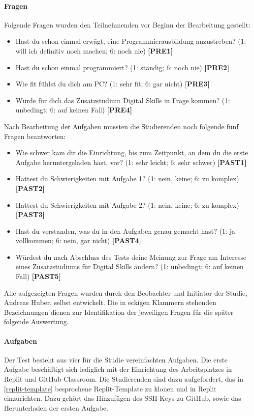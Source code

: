 \paragraph{Fragen}
Folgende Fragen wurden den Teilnehmenden vor Beginn der Bearbeitung gestellt:

\begin{itemize}
    \item Hast du schon einmal erwägt, eine Programmierausbildung anzustreben?
    (1: will ich definitiv noch machen; 6: noch nie) \textbf{[PRE1]}
    \item Hast du schon einmal programmiert? (1: ständig; 6: noch nie)
    \textbf{[PRE2]}
    \item Wie fit fühlst du dich am PC? (1: sehr fit; 6: gar nicht)
    \textbf{[PRE3]}
    \item Würde für dich das Zusatzstudium Digital Skills in Frage kommen?
    (1: unbedingt; 6: auf keinen Fall) \textbf{[PRE4]}
\end{itemize}

Nach Bearbeitung der Aufgaben mussten die Studierenden noch folgende fünf
Fragen beantworten:

\begin{itemize}
    \item Wie schwer kam dir die Einrichtung, bis zum Zeitpunkt, an dem du die
    erste Aufgabe heruntergeladen hast, vor? (1: sehr leicht; 6: sehr schwer)
    \textbf{[PAST1]}
    \item Hattest du Schwierigkeiten mit Aufgabe 1? (1: nein, keine; 6: zu
    komplex) \textbf{[PAST2]}
    \item Hattest du Schwierigkeiten mit Aufgabe 2? (1: nein, keine; 6: zu
    komplex) \textbf{[PAST3]}
    \item Hast du verstanden, was du in den Aufgaben genau gemacht hast? (1: ja
    vollkommen; 6: nein, gar nicht) \textbf{[PAST4]}
    \item Würdest du nach Abschluss des Tests deine Meinung zur Frage am
    Interesse eines Zusatzstudiums für Digital Skills ändern? (1: unbedingt;
    6: auf keinen Fall) \textbf{[PAST5]}
\end{itemize}

Alle aufgezeigten Fragen wurden durch den Beobachter und Initiator der Studie,
Andreas Huber, selbst entwickelt. Die in eckigen Klammern stehenden
Bezeichnungen dienen zur Identifikation der jeweiligen Fragen für die später
folgende Auswertung.

\paragraph{Aufgaben}
Der Test besteht aus vier für die Studie vereinfachten Aufgaben. Die erste
Aufgabe beschäftigt sich lediglich mit der Einrichtung des Arbeitsplatzes in
Replit und GitHub-Classroom. Die Studierenden sind dazu aufgefordert, das in 
\autoref{replit-template} besprochene Replit-Template zu klonen und in  Replit
einzurichten. Dazu gehört das Hinzufügen des SSH-Keys zu GitHub, sowie das
Herunterladen der ersten Aufgabe. \parencite{git-repo:replit-template}


